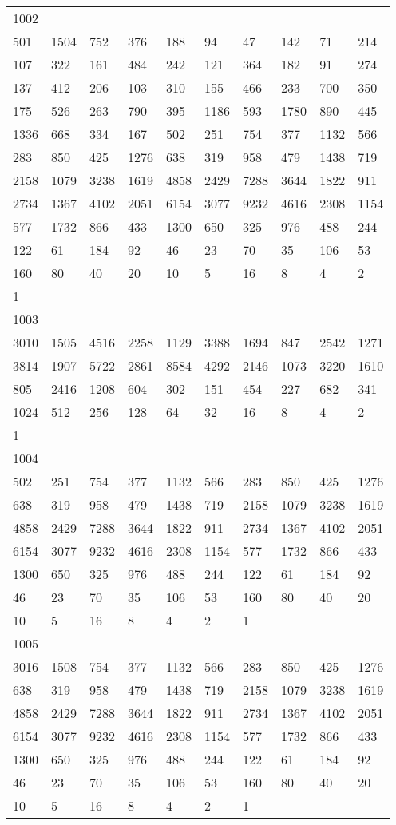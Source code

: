 \begin{longtable}{*{10}{l}}
1002&&&&&&&&&\\
501& 1504& 752& 376& 188& 94& 47& 142& 71& 214\\
107& 322& 161& 484& 242& 121& 364& 182& 91& 274\\
137& 412& 206& 103& 310& 155& 466& 233& 700& 350\\
175& 526& 263& 790& 395& 1186& 593& 1780& 890& 445\\
1336& 668& 334& 167& 502& 251& 754& 377& 1132& 566\\
283& 850& 425& 1276& 638& 319& 958& 479& 1438& 719\\
2158& 1079& 3238& 1619& 4858& 2429& 7288& 3644& 1822& 911\\
2734& 1367& 4102& 2051& 6154& 3077& 9232& 4616& 2308& 1154\\
577& 1732& 866& 433& 1300& 650& 325& 976& 488& 244\\
122& 61& 184& 92& 46& 23& 70& 35& 106& 53\\
160& 80& 40& 20& 10& 5& 16& 8& 4& 2\\
1& \\

1003&&&&&&&&&\\
3010& 1505& 4516& 2258& 1129& 3388& 1694& 847& 2542& 1271\\
3814& 1907& 5722& 2861& 8584& 4292& 2146& 1073& 3220& 1610\\
805& 2416& 1208& 604& 302& 151& 454& 227& 682& 341\\
1024& 512& 256& 128& 64& 32& 16& 8& 4& 2\\
1& \\

1004&&&&&&&&&\\
502& 251& 754& 377& 1132& 566& 283& 850& 425& 1276\\
638& 319& 958& 479& 1438& 719& 2158& 1079& 3238& 1619\\
4858& 2429& 7288& 3644& 1822& 911& 2734& 1367& 4102& 2051\\
6154& 3077& 9232& 4616& 2308& 1154& 577& 1732& 866& 433\\
1300& 650& 325& 976& 488& 244& 122& 61& 184& 92\\
46& 23& 70& 35& 106& 53& 160& 80& 40& 20\\
10& 5& 16& 8& 4& 2& 1& \\

1005&&&&&&&&&\\
3016& 1508& 754& 377& 1132& 566& 283& 850& 425& 1276\\
638& 319& 958& 479& 1438& 719& 2158& 1079& 3238& 1619\\
4858& 2429& 7288& 3644& 1822& 911& 2734& 1367& 4102& 2051\\
6154& 3077& 9232& 4616& 2308& 1154& 577& 1732& 866& 433\\
1300& 650& 325& 976& 488& 244& 122& 61& 184& 92\\
46& 23& 70& 35& 106& 53& 160& 80& 40& 20\\
10& 5& 16& 8& 4& 2& 1& \\


\end{longtable}
